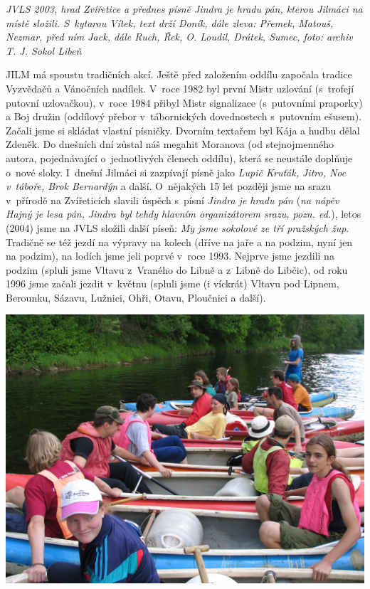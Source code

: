 \documentclass[a5paper, 11pt, twoside]{article}
\begin{document}
\textit{JVLS 2003, hrad Zvířetice a přednes písně Jindra je hradu pán,
kterou Jilmáci na místě složili. S~kytarou Vítek, text drží Doník, dále
zleva: Přemek, Matouš, Nezmar, před ním Jack, dále Ruch, Řek, O. Loudil,
Drátek, Sumec, foto: archiv T. J. Sokol Libeň}

JILM má spoustu tradičních akcí. Ještě před založením oddílu započala
tradice Vyzvědačů a Vánočních nadílek. V~roce 1982 byl první Mistr
uzlování (s~trofejí putovní uzlovačkou), v~roce 1984 přibyl Mistr
signalizace (s~putovními praporky) a Boj družin (oddílový přebor
v~tábornických dovednostech s~putovním ešusem). Začali jsme si skládat
vlastní písničky. Dvorním textařem byl Kája a hudbu dělal Zdeněk. Do
dnešních dní zůstal náš megahit Moranova (od stejnojmenného autora,
pojednávající o~jednotlivých členech oddílu), která se neustále doplňuje
o~nové sloky. I~dnešní Jilmáci si zazpívají písně jako \textit{Lupič
Kruťák, Jitro, Noc v~táboře, Brok Bernardýn} a další. O~nějakých 15 let
později jsme na srazu v~přírodě na Zvířeticích slavili úspěch s~písní
\textit{Jindra je hradu pán} (\textit{na nápěv Hajný je lesa pán, Jindra byl
tehdy hlavním organizátorem srazu, pozn. ed.}), letos (2004) jsme na
JVLS složili další píseň: \textit{My jsme sokolové ze tří pražských žup}.
Tradičně se též jezdí na výpravy na kolech (dříve na jaře a na podzim,
nyní jen na podzim), na lodích jsme jeli poprvé v~roce 1993. Nejprve
jsme jezdili na podzim (spluli jsme Vltavu z~Vraného do Libně a z~Libně
do Libčic), od roku 1996 jsme začali jezdit v~květnu (spluli jsme (i
víckrát) Vltavu pod Lipnem, Berounku, Sázavu, Lužnici, Ohři, Otavu,
Ploučnici a další).

 \includegraphics[width=\textwidth]{img/79_lodovka.JPG}
\end{document}
